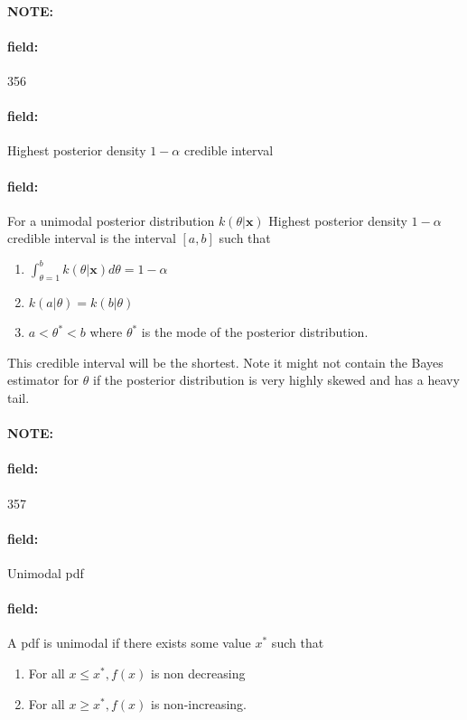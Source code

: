 \documentclass[12pt]{article}
\newenvironment{note}{\paragraph{NOTE:}}{}
\newenvironment{field}{\paragraph{field:}}{}
\begin{document}
\begin{note}
    \begin{field}
        \tiny 356
    \end{field}
    \begin{field}
        Highest posterior density $1 - \alpha$ credible interval
    \end{field}
    \begin{field}
        For a unimodal posterior distribution $k(\theta|\mathbf{x})$ Highest posterior density $1 - \alpha$ credible interval is the interval $[a,b]$ such that
        \begin{enumerate}
          \item $\int_{\theta = 1}^b k(\theta|\mathbf{x})d\theta = 1 - \alpha$
          \item $k(a|\theta) = k(b|\theta)$
          \item $a < \theta^* < b$ where $\theta^*$ is the mode of the posterior distribution.
        \end{enumerate}

        This credible interval will be the shortest. Note it might not contain the Bayes estimator for $\theta$ if the posterior distribution is very highly skewed and has a heavy tail.
    \end{field}
\end{note}

\begin{note}
    \begin{field}
        \tiny 357
    \end{field}
    \begin{field}
        Unimodal pdf
    \end{field}
    \begin{field}
        A pdf is unimodal if there exists some value $x^*$ such that
        \begin{enumerate}
          \item For all $x \leq x^*, f(x)$ is non decreasing
          \item For all $x \geq x^*, f(x)$ is non-increasing.
        \end{enumerate}
    \end{field}
\end{note}
\end{document}
